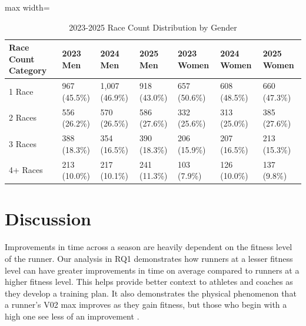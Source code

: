 \documentclass[suppldata]{interact}
\theoremstyle{plain}%
\theoremstyle{definition}
\theoremstyle{remark}
\begin{document}
\begin{table}[ht]
    \centering
    \begin{adjustbox}{max width=\linewidth}
    \begin{tabular}{|@{}l|l@{}|l|l|l@{}|l|l|}
        \hline
        \textbf{Race Count Category} & \textbf{2023 Men} & \textbf{2024 Men}&\textbf{2025 Men}& \textbf{2023 Women} & \textbf{2024 Women}&\textbf{2025 Women}\\ \hline
        1 Race & 967 (45.5\%)  & 1,007 (46.9\%) &918 (43.0\%)& 657 (50.6\%)  & 608 (48.5\%) &660 (47.3\%)\\ \hline
        2 Races & 556 (26.2\%)  & 570 (26.5\%) &586 (27.6\%)& 332 (25.6\%)  & 313 (25.0\%) &385 (27.6\%)\\ \hline
        3 Races & 388 (18.3\%)  & 354 (16.5\%) &390 (18.3\%)& 206 (15.9\%)  & 207 (16.5\%) &213 (15.3\%)\\ \hline
        4+ Races & 213 (10.0\%)  & 217 (10.1\%) &241 (11.3\%)& 103 (7.9\%)  & 126 (10.0\%) &137  (9.8\%)\\ \hline
    \end{tabular}
    \end{adjustbox}
    \caption{2023-2025 Race Count Distribution by Gender}
    \label{tab:2023_gender_race_distribution}
\end{table}

\FloatBarrier


\section{Discussion}

Improvements in time across a season are heavily dependent on the fitness level of the runner. Our analysis in RQ1 demonstrates how runners at a lesser fitness level can have greater improvements in time on average compared to runners at a higher fitness level. This helps provide better context to athletes and coaches as they develop a training plan. It also demonstrates the physical phenomenon that a runner's V02 max improves as they gain fitness, but those who begin with a high one see less of an improvement \cite{niemeyer2021oxygen}.
\end{document}
